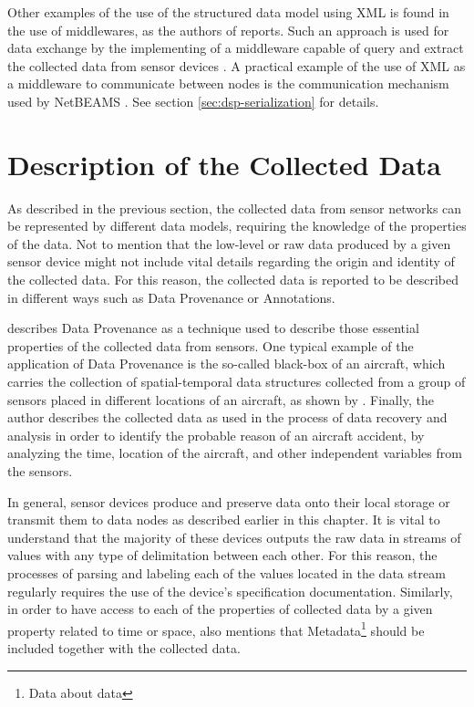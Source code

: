 Other examples of the use of the structured data model using XML is found in
the use of middlewares, as the authors of \cite{sn-xml-query-engines} reports.
Such an approach is used for data exchange by the implementing of a middleware
capable of query and extract the collected data from sensor devices
\cite{sn-xml-middleware}. A practical example of the use of XML as a middleware
to communicate between nodes is the communication mechanism used by NetBEAMS
\cite{netbeams2009}. See section \ref{sec:dsp-serialization} for details.

\section{Description of the Collected Data}
\label{sec:sn-data-description}

As described in the previous section, the collected data from sensor networks
can be represented by different data models, requiring the knowledge of the
properties of the data. Not to mention that the low-level or raw data produced
by a given sensor device might not include vital details regarding the
origin and identity of the collected data. For this reason, the collected data
is reported to be described in different ways such as Data Provenance or
Annotations.

\cite{sn-provenance} describes Data Provenance as a technique used to describe
those essential properties of the collected data from sensors. One typical
example of the application of Data Provenance is the so-called black-box of an
aircraft, which carries the collection of spatial-temporal data structures
collected from a group of sensors placed in different locations of an
aircraft, as shown by \cite{sn-exemple-blackbox}. Finally, the author describes 
the collected data as used in the process of data recovery and analysis in order to
identify the probable reason of an aircraft accident, by analyzing the time, 
location of the aircraft, and other independent variables from the sensors.

In general, sensor devices produce and preserve data onto their local
storage or transmit them to data nodes as described earlier in this chapter. It
is vital to understand that the majority of these devices outputs the raw data
in streams of values with any type of delimitation between each other. For
this reason, the processes of parsing and labeling each of the values located
in the data stream regularly requires the use of the device's specification
documentation. Similarly, in order to have access to each of the properties of
collected data by a given property related to time or space,
\cite{sn-provenance} also mentions that Metadata\footnote{Data about data}
should be included together with the collected data.


